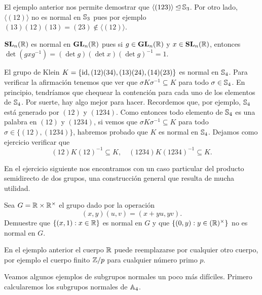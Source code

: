 \begin{example}
El ejemplo anterior nos permite demostrar que $\langle (123)\rangle\unlhd\mathbb{S}_3$. Por otro lado, $\langle (12)\rangle$ no es normal en $\mathbb{S}_3$ pues
por ejemplo $(13)(12)(13)=(23)\not\in\langle(12)\rangle$. 
\end{example}

\begin{example}
$\mathbf{SL}_n(\mathbb{R})$ es normal en $\mathbf{GL}_n(\mathbb{R})$ pues si $g\in\mathbf{GL}_n(\mathbb{R})$ y $x\in\mathbf{SL}_n(\mathbb{R})$, entonces $\det(gxg^{-1})=(\det g)(\det x)(\det g)^{-1}=1$. 
\end{example}

\begin{example}
El grupo de Klein $K=\{\operatorname{id},(12)(34),(13)(24),(14)(23)\}$ es normal en $\mathbb{S}_4$. Para verificar la afirmación 
tenemos que ver que $\sigma K\sigma^{-1}\subseteq K$ para todo $\sigma\in\mathbb{S}_4$. En principio, 
tendríamos que chequear la contención para cada uno de los elementos de $\mathbb{S}_4$. Por suerte, hay algo mejor para hacer. Recordemos
que, por ejemplo, $\mathbb{S}_4$ está generado por $(12)$ y $(1234)$.  Como 
entonces todo elemento de $\mathbb{S}_4$ es una palabra en $(12)$ y 
$(1234)$, 
si vemos que $\sigma K\sigma^{-1}\subseteq K$ para todo $\sigma\in\{(12),(1234)\}$, 
habremos probado que $K$ es normal en $\mathbb{S}_4$. Dejamos como ejercicio verificar que
\[
(12)K(12)^{-1}\subseteq K,\quad
(1234)K(1234)^{-1}\subseteq K.
\]  
\end{example}


En el ejercicio siguiente nos encontramos con un caso particular del producto semidirecto de dos grupos, una construcción general que resulta de mucha utilidad. 

\begin{exercise}
Sea $G=\mathbb{R}\times\mathbb{R}^\times$ el grupo dado por la operación 
\[
(x,y)(u,v)=(x+yu,yv).
\]	
Demuestre que $\{(x,1):x\in\mathbb{R}\}$ es normal en $G$ y que $\{(0,y):y\in(\mathbb{R})^\times\}$ no es normal en $G$. 
\end{exercise}

En el ejemplo anterior el cuerpo $\mathbb{R}$ puede reemplazarse por cualquier otro cuerpo, por ejemplo 
el cuerpo finito $\mathbb{Z}/p$ para cualquier número primo $p$. 
 
 
Veamos algunos ejemplos de subgrupos normales un poco más difíciles. Primero calcularemos los subgrupos normales de $\mathbb{A}_4$. 


